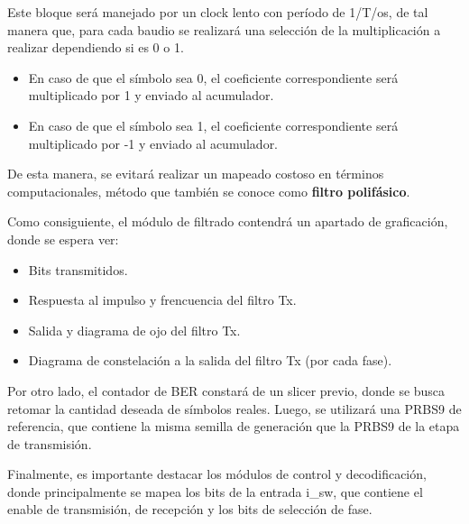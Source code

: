 \documentclass[12pt, a4paper]{article}
\begin{document}
    Este bloque será manejado por un clock lento con período de 1/T/os, de tal manera que, para cada baudio se realizará una selección 
    de la multiplicación a realizar dependiendo si es 0 o 1.
    \begin{itemize}
        \item En caso de que el símbolo sea 0, el coeficiente correspondiente será multiplicado por 1 y enviado al acumulador.
        \item En caso de que el símbolo sea 1, el coeficiente correspondiente será multiplicado por -1 y enviado al acumulador.
    \end{itemize}
    De esta manera, se evitará realizar un mapeado costoso en términos computacionales, método que también se conoce como \textbf{filtro polifásico}.

    Como consiguiente, el módulo de filtrado contendrá un apartado de graficación, donde se espera ver:
    \begin{itemize}
        \item Bits transmitidos.
        \item Respuesta al impulso y frencuencia del filtro Tx.
        \item Salida y diagrama de ojo del filtro Tx.
        \item Diagrama de constelación a la salida del filtro Tx (por cada fase).
    \end{itemize}
    
    Por otro lado, el contador de BER constará de un slicer previo, donde se busca retomar la cantidad deseada de símbolos reales.
    Luego, se utilizará una PRBS9 de referencia, que contiene la misma semilla de generación que la PRBS9 de la etapa de transmisión.

    Finalmente, es importante destacar los módulos de control y decodificación, donde principalmente se mapea los bits de la entrada
    i\_sw, que contiene el enable de transmisión, de recepción y los bits de selección de fase.
    
\end{document}
